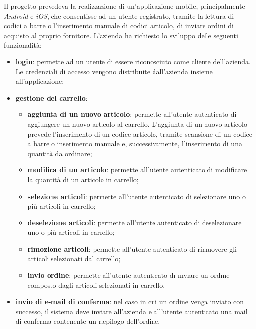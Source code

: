 Il progetto prevedeva la realizzazione di un'applicazione mobile, principalmente \textit{Android} e \textit{iOS}, che consentisse ad un utente registrato, tramite la lettura di codici a barre o l'inserimento manuale di codici articolo, di inviare ordini di acquisto al proprio fornitore. L'azienda ha richiesto lo sviluppo delle seguenti funzionalità:
\begin{itemize}
	\item \textbf{login}: permette ad un utente di essere riconosciuto come cliente dell'azienda. Le credenziali di accesso vengono distribuite dall'azienda insieme all'applicazione;
	\item \textbf{gestione del carrello}:
	\begin{itemize}
		\item \textbf{aggiunta di un nuovo articolo}: permette all'utente autenticato di aggiungere un nuovo articolo al carrello. L'aggiunta di un nuovo articolo prevede l'inserimento di un codice articolo, tramite scansione di un codice a barre o inserimento manuale e, successivamente, l'inserimento di una quantità da ordinare;
		\item \textbf{modifica di un articolo}: permette all'utente autenticato di modificare la quantità di un articolo in carrello;
		\item \textbf{selezione articoli}: permette all'utente autenticato di selezionare uno o più articoli in carrello;
		\item \textbf{deselezione articoli}: permette all'utente autenticato di deselezionare uno o più articoli in carrello;
		\item \textbf{rimozione articoli}: permette all'utente autenticato di rimuovere gli articoli selezionati dal carrello;
		\item \textbf{invio ordine}: permette all'utente autenticato di inviare un ordine composto dagli articoli selezionati in carrello.
	\end{itemize}
	\item \textbf{invio di e-mail di conferma}: nel caso in cui un ordine venga inviato con successo, il sistema deve inviare all'azienda e all'utente autenticato una mail di conferma contenente un riepilogo dell'ordine.
\end{itemize}

